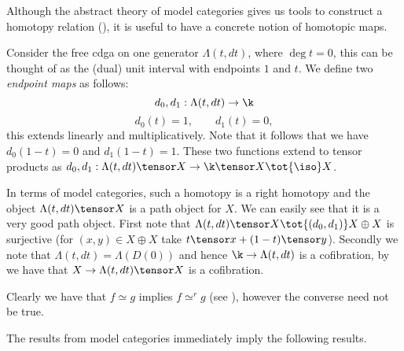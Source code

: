 
Although the abstract theory of model categories gives us tools to construct a homotopy relation (), it is useful to have a concrete notion of homotopic maps.

Consider the free cdga on one generator $\Lambda(t, dt)$, where $\deg{t} = 0$, this can be thought of as the (dual) unit interval with endpoints $1$ and $t$. We define two \emph{endpoint maps} as follows:
$$ d_0, d_1 : \Lambda(t, dt) \to \k $$
$$ d_0(t) = 1, \qquad d_1(t) = 0, $$
this extends linearly and multiplicatively. Note that it follows that we have $d_0(1-t) = 0$ and $d_1(1-t) = 1$. These two functions extend to tensor products as $d_0, d_1: \Lambda(t, dt) \tensor X \to \k \tensor X \tot{\iso} X$.


In terms of model categories, such a homotopy is a right homotopy and the object $\Lambda(t, dt) \tensor X$ is a path object for $X$. We can easily see that it is a very good path object. First note that $\Lambda(t, dt) \tensor X \tot{(d_0, d_1)} X \oplus X$ is surjective (for $(x, y) \in X \oplus X$ take $t \tensor x + (1-t) \tensor y$). Secondly we note that $\Lambda(t, dt) = \Lambda(D(0))$ and hence $\k \to \Lambda(t, dt)$ is a cofibration, by  we have that $X \to \Lambda(t, dt) \tensor X$ is a cofibration.

Clearly we have that $f \simeq g$ implies $f \simeq^r g$ (see ), however the converse need not be true.



The results from model categories immediately imply the following results. 

